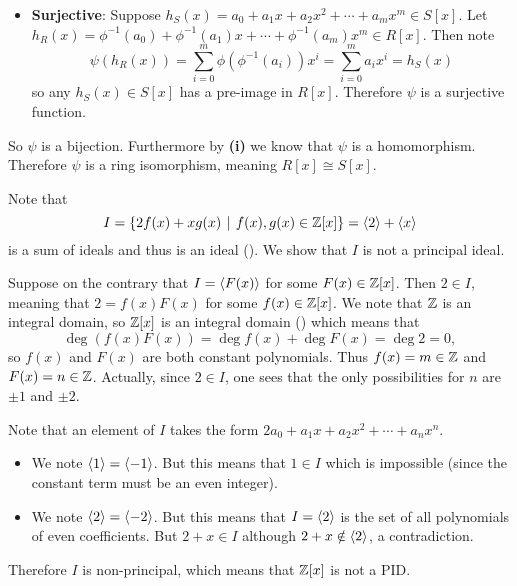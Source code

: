 \begin{questions}
\begin{partquestions}{\roman*}
\begin{itemize}
            \item \textbf{Surjective}: Suppose $h_S(x) = a_0 + a_1x + a_2x^2 + \cdots + a_mx^m \in S[x]$. Let $h_R(x) = \phi^{-1}(a_0) + \phi^{-1}(a_1)x + \cdots + \phi^{-1}(a_m)x^m \in R[x]$. Then note
            \[
                \psi(h_R(x)) = \sum_{i=0}^m\phi(\phi^{-1}(a_i))x^i = \sum_{i=0}^ma_ix^i = h_S(x)
            \]
            so any $h_S(x) \in S[x]$ has a pre-image in $R[x]$. Therefore $\psi$ is a surjective function.
        \end{itemize}

        So $\psi$ is a bijection. Furthermore by \textbf{(i)} we know that $\psi$ is a homomorphism. Therefore $\psi$ is a ring isomorphism, meaning $R[x] \cong S[x]$.
    \end{partquestions}

    \item Note that
    \[
        I = \{2f(x) + xg(x) \vert f(x),g(x) \in \Z[x]\} = \princ{2} + \princ{x}
    \]
    is a sum of ideals and thus is an ideal (). We show that $I$ is not a principal ideal.

    Suppose on the contrary that $I = \left\langle F(x)\right\rangle$ for some $F(x) \in \mathbb{Z}[x]$. Then $2 \in I$, meaning that $2 = f(x)F(x)$ for some $f(x) \in \mathbb{Z}[x]$. We note that $\mathbb{Z}$ is an integral domain, so $\mathbb{Z}[x]$ is an integral domain () which means that
    \[
        \deg(f(x)F(x)) = \deg f(x) + \deg F(x) = \deg 2 = 0,
    \]
    so $f(x)$ and $F(x)$ are both constant polynomials. Thus $f(x) = m \in \mathbb{Z}$ and $F(x) = n \in \mathbb{Z}$. Actually, since $2 \in I$, one sees that the only possibilities for $n$ are $\pm1$ and $\pm2$.

    Note that an element of $I$ takes the form $2a_0 + a_1x + a_2x^2 + \cdots + a_nx^n$.
    \begin{itemize}
        \item We note $\left\langle1\right\rangle = \left\langle-1\right\rangle$. But this means that $1 \in I$ which is impossible (since the constant term must be an even integer).
        \item We note $\left\langle2\right\rangle = \left\langle-2\right\rangle$. But this means that $I = \left\langle2\right\rangle$ is the set of all polynomials of even coefficients. But $2 + x \in I$ although $2 + x \notin \left\langle2\right\rangle$, a contradiction.
    \end{itemize}

    Therefore $I$ is non-principal, which means that $\mathbb{Z}[x]$ is not a PID.
\end{questions}
